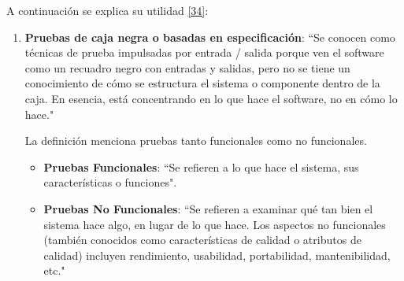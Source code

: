 A continuación se explica su utilidad \hyperlink{b34}{[34]}:  

\begin{enumerate}
	\item \textbf {Pruebas de caja negra o basadas en especificación}: ``Se conocen como técnicas de prueba impulsadas por entrada / salida porque ven el software como un recuadro negro con entradas y salidas, pero no se tiene un conocimiento de cómo se estructura el sistema o componente dentro de la caja. En esencia, está concentrando en lo que hace el software, no en cómo lo hace."
	
		La definición menciona pruebas tanto funcionales como no funcionales.
		\begin{itemize}
			\item \textbf {Pruebas Funcionales}: ``Se refieren a lo que hace el sistema, sus características o funciones".
			\item \textbf {Pruebas No Funcionales}: ``Se refieren a examinar qué tan bien el sistema hace algo, en lugar de lo que hace. Los aspectos no funcionales (también conocidos como características de calidad o atributos de calidad) incluyen rendimiento, usabilidad, portabilidad, mantenibilidad, etc."
		\end{itemize}
	

\end{enumerate}
